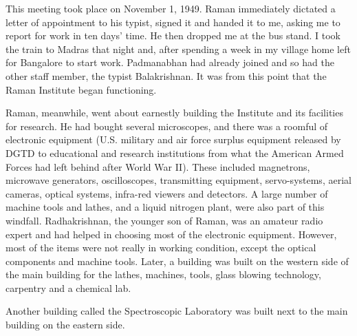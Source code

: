 \begin{figure}[p]
\end{figure}

This meeting took place on November 1, 1949. Raman
immediately dictated a letter of appointment to his typist,
signed it and handed it to me, asking me to report for work in
ten days' time. He then dropped me at the bus stand. I took the
train to Madras that night and, after spending a week in my
village home left for Bangalore to start work. Padmanabhan had
already joined and so had the other staff member, the typist
Balakrishnan. It was from this point that the Raman Institute
began functioning.

Raman, meanwhile, went about earnestly building the
Institute and its facilities for research. He had bought several
microscopes, and there was a roomful of electronic equipment
(U.S. military and air force surplus equipment released by DGTD
to educational and research institutions from what the American
Armed Forces had left behind after World War II). These
included magnetrons, microwave generators, oscilloscopes,
transmitting equipment, servo-systems, ae\-rial cameras, optical
systems, infra-red viewers and detectors. A large number of
machine tools and lathes, and a liquid nitrogen plant, were also
part of this windfall. Radhakrishnan, the younger son of Raman,
was an amateur radio expert and had helped in choosing most
of the electronic equipment. However, most of the items were
not really in working condition, except the optical components
and machine tools. Later, a building was built on the western
side of the main building for the lathes, machines, tools, glass
blowing technology, carpentry and a chemical lab.

Another building called the Spectroscopic Laboratory was
built next to the main building on the eastern side.

